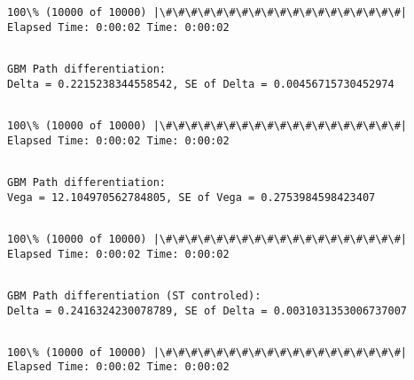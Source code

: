 \documentclass[11pt]{article}
\begin{document}
    \begin{Verbatim}[commandchars=\\\{\}]
100\% (10000 of 10000) |\#\#\#\#\#\#\#\#\#\#\#\#\#\#\#\#\#\#\#| Elapsed Time: 0:00:02 Time: 0:00:02

    \end{Verbatim}

    \begin{Verbatim}[commandchars=\\\{\}]

GBM Path differentiation:
Delta = 0.2215238344558542, SE of Delta = 0.00456715730452974


    \end{Verbatim}

    \begin{Verbatim}[commandchars=\\\{\}]
100\% (10000 of 10000) |\#\#\#\#\#\#\#\#\#\#\#\#\#\#\#\#\#\#\#| Elapsed Time: 0:00:02 Time: 0:00:02

    \end{Verbatim}

    \begin{Verbatim}[commandchars=\\\{\}]

GBM Path differentiation:
Vega = 12.104970562784805, SE of Vega = 0.2753984598423407


    \end{Verbatim}

    \begin{Verbatim}[commandchars=\\\{\}]
100\% (10000 of 10000) |\#\#\#\#\#\#\#\#\#\#\#\#\#\#\#\#\#\#\#| Elapsed Time: 0:00:02 Time: 0:00:02

    \end{Verbatim}

    \begin{Verbatim}[commandchars=\\\{\}]

GBM Path differentiation (ST controled):
Delta = 0.2416324230078789, SE of Delta = 0.0031031353006737007


    \end{Verbatim}

    \begin{Verbatim}[commandchars=\\\{\}]
100\% (10000 of 10000) |\#\#\#\#\#\#\#\#\#\#\#\#\#\#\#\#\#\#\#| Elapsed Time: 0:00:02 Time: 0:00:02

    \end{Verbatim}
\end{document}
